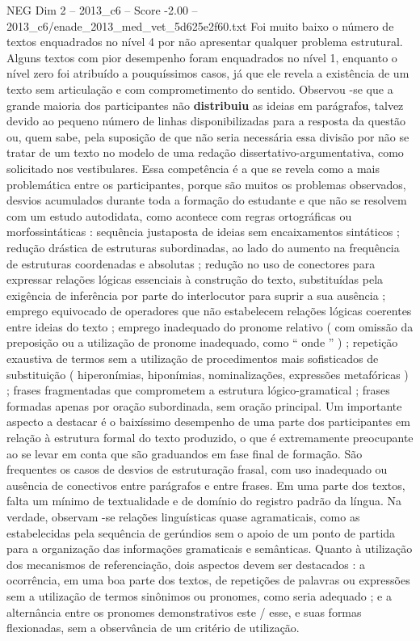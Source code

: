 \begin{textsample}{NEG Dim 2 – 2013\_c6 – Score -2.00 – 2013\_c6/enade\_2013\_med\_vet\_5d625e2f60.txt}
Foi muito baixo o número de textos enquadrados no nível 4 por não apresentar qualquer problema estrutural.
Alguns textos com pior desempenho foram enquadrados no nível 1, enquanto o nível zero foi atribuído a pouquíssimos casos, já que ele revela a existência de um texto sem articulação e com comprometimento do sentido.
Observou -se que a grande maioria dos participantes não \textbf{distribuiu} as ideias em parágrafos, talvez devido ao pequeno número de linhas disponibilizadas para a resposta da questão ou, quem sabe, pela suposição de que não seria necessária essa divisão por não se tratar de um texto no modelo de uma redação dissertativo-argumentativa, como solicitado nos vestibulares.
Essa competência é a que se revela como a mais problemática entre os participantes, porque são muitos os problemas observados, desvios acumulados durante toda a formação do estudante e que não se resolvem com um estudo autodidata, como acontece com regras ortográficas ou morfossintáticas : sequência justaposta de ideias sem encaixamentos sintáticos ; redução drástica de estruturas subordinadas, ao lado do aumento na frequência de estruturas coordenadas e absolutas ; redução no uso de conectores para expressar relações lógicas essenciais à construção do texto, substituídas pela exigência de inferência por parte do interlocutor para suprir a sua ausência ; emprego equivocado de operadores que não estabelecem relações lógicas coerentes entre ideias do texto ; emprego inadequado do pronome relativo ( com omissão da preposição ou a utilização de pronome inadequado, como “ onde ” ) ; repetição exaustiva de termos sem a utilização de procedimentos mais sofisticados de substituição ( hiperonímias, hiponímias, nominalizações, expressões metafóricas ) ; frases fragmentadas que comprometem a estrutura lógico-gramatical ; frases formadas apenas por oração subordinada, sem oração principal.
Um importante aspecto a destacar é o baixíssimo desempenho de uma parte dos participantes em relação à estrutura formal do texto produzido, o que é extremamente preocupante ao se levar em conta que são graduandos em fase final de formação.
São frequentes os casos de desvios de estruturação frasal, com uso inadequado ou ausência de conectivos entre parágrafos e entre frases.
Em uma parte dos textos, falta um mínimo de textualidade e de domínio do registro padrão da língua.
Na verdade, observam -se relações linguísticas quase agramaticais, como as estabelecidas pela sequência de gerúndios sem o apoio de um ponto de partida para a organização das informações gramaticais e semânticas.
Quanto à utilização dos mecanismos de referenciação, dois aspectos devem ser destacados : a ocorrência, em uma boa parte dos textos, de repetições de palavras ou expressões sem a utilização de termos sinônimos ou pronomes, como seria adequado ; e a alternância entre os pronomes demonstrativos este / esse, e suas formas flexionadas, sem a observância de um critério de utilização.

\end{textsample}
